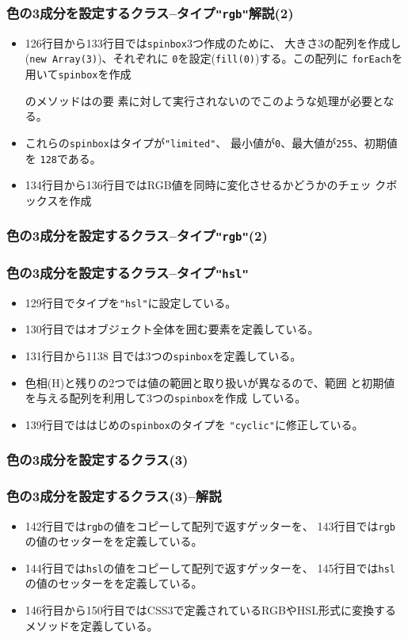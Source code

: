  \begin{frame}[containsverbatim]
  \frametitle{色の3成分を設定するクラス--タイプ\texttt{"rgb"}解説(2)}
			 \begin{itemize}
			  \item 126行目から133行目では\texttt{spinbox}3つ作成のために、
							大きさ3の配列を作成し(\texttt{new Array(3)})、それぞれに
							\texttt{0}を設定(\texttt{fill(0)})する。この配列に
							\texttt{forEach}を用いて\texttt{spinbox}を作成

							のメソッドはの要
							素に対して実行されないのでこのような処理が必要となる。
				\item これらの\texttt{spinbox}はタイプが\texttt{"limited"}、
							最小値が\texttt{0}、最大値が\texttt{255}、初期値を
							\texttt{128}である。
				\item 134行目から136行目ではRGB値を同時に変化させるかどうかのチェッ
							クボックスを作成
			 \end{itemize}
 \end{frame}
 \begin{frame}[containsverbatim]
  \frametitle{色の3成分を設定するクラス--タイプ\texttt{"rgb"}(2)}
\end{frame}
 \begin{frame}[containsverbatim]
  \frametitle{色の3成分を設定するクラス--タイプ\texttt{"hsl"}}
			 \begin{itemize}
				\item 129行目でタイプを\texttt{"hsl"}に設定している。
				\item 130行目ではオブジェクト全体を囲む要素を定義している。
				\item 131行目から1138 目では3つの\texttt{spinbox}を定義している。
				\item 色相(H)と残りの2つでは値の範囲と取り扱いが異なるので、範囲
							と初期値を与える配列を利用して3つの\texttt{spinbox}を作成
							している。
				\item 139行目でははじめの\texttt{spinbox}のタイプを
							\texttt{"cyclic"}に修正している。
			 \end{itemize}
 \end{frame}
 \begin{frame}[containsverbatim]
  \frametitle{色の3成分を設定するクラス(3)}
\end{frame}
 \begin{frame}[containsverbatim]
  \frametitle{色の3成分を設定するクラス(3)--解説}
  \begin{itemize}
 \item 142行目では\texttt{rgb}の値をコピーして配列で返すゲッターを、
 143行目では\texttt{rgb}の値のセッターをを定義している。
 \item 144行目では\texttt{hsl}の値をコピーして配列で返すゲッターを、
 145行目では\texttt{hsl}の値のセッターをを定義している。
 \item 146行目から150行目ではCSS3で定義されているRGBやHSL形式に変換する
			 メソッドを定義している。
\end{itemize}
 \end{frame}
